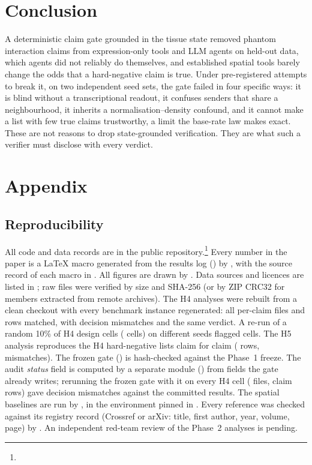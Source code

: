 \documentclass[letterpaper]{article} %
\begin{document}
\section{Conclusion}
A deterministic claim gate grounded in the tissue state removed phantom interaction claims from expression-only tools
and LLM agents on held-out data, which agents did not reliably do themselves, and established spatial tools barely
change the odds that a hard-negative claim is true. Under pre-registered attempts to break it, on two independent seed
sets, the gate failed in four specific ways: it is blind without a transcriptional readout, it confuses senders that
share a neighbourhood, it inherits a normalisation--density confound, and it cannot make a list with few true claims
trustworthy, a limit the base-rate law makes exact. These are not reasons to drop state-grounded verification. They are
what such a verifier must disclose with every verdict.



\appendix

\section{Appendix}
\subsection{Reproducibility}
All code and data records are in the public repository.\footnote{\repo} Every number in the paper is a LaTeX macro
generated from the results log (\repoResults) by \repoNumbers, with the source record of each macro in
\repoProvenance. All figures are drawn by \repoFigures. Data sources and licences are listed in \repoDataSources; raw
files were verified by size and SHA-256 (or by ZIP CRC32 for members extracted from remote archives). The H4 analyses
were rebuilt from a clean checkout with every benchmark instance regenerated: all \rebuildFiles{} per-claim files and
\rebuildRows{} rows matched, with \rebuildMismatch{} decision mismatches and the same verdict. A re-run of a random 10\%
of H4 design cells (\auditCells{} cells) on different seeds flagged \auditFlagged{} cells. The H5 analysis reproduces
the H4 hard-negative lists claim for claim (\consRows{} rows, \consMismatch{} mismatches). The frozen gate
(\repoGate) is hash-checked against the Phase~1 freeze. The audit \emph{status} field is computed by a separate module
(\repoStatus) from fields the gate already writes; rerunning the frozen gate with it on every H4 cell
(\statusEqFiles{} files, \statusEqRows{} claim rows) gave \statusEqMismatch{} decision mismatches against the committed
results. The spatial baselines are run by \repoBaselines, in the environment pinned in \repoLockS. Every reference was
checked against its registry record (Crossref or arXiv: title, first author, year, volume, page) by
\repoCitationAudit. An independent red-team review of the Phase~2 analyses is pending.
\end{document}
